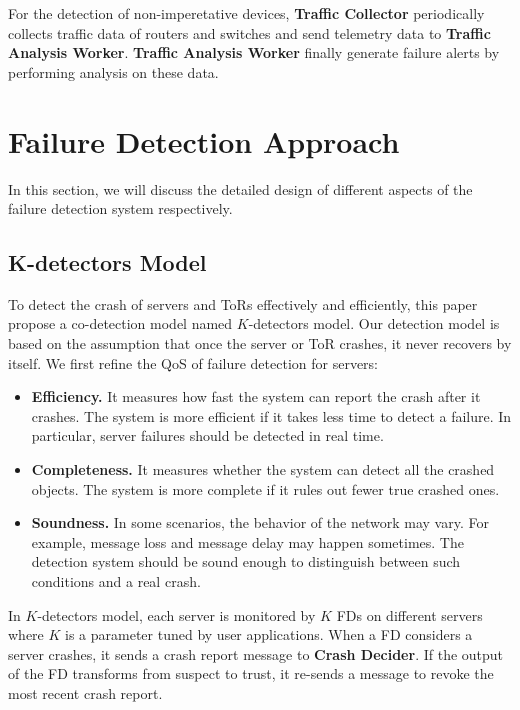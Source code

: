 \documentclass{sig-alternate-05-2015}
\begin{document}
For the detection of non-imperetative devices, \textbf{Traffic Collector} periodically collects traffic data of routers and switches and send telemetry data to \textbf{Traffic Analysis Worker}. \textbf{Traffic Analysis Worker} finally generate failure alerts by performing analysis on these data.



\section{Failure Detection Approach}
In this section, we will discuss the detailed design of different aspects of the failure detection system respectively.

\subsection{K-detectors Model}
To detect the crash of servers and ToRs effectively and efficiently, this paper propose a co-detection model named $K$-detectors model. Our detection model is based on the assumption that once the server or ToR crashes, it never recovers by itself. We first refine the QoS of failure detection for servers:

\begin{itemize}
\item \textbf{Efficiency.} It measures how fast the system can report the crash after it crashes. The system is more efficient if it takes less time to detect a failure. In particular, server failures should be detected in real time.
\item \textbf{Completeness.} It measures whether the system can detect all the crashed objects. The system is more complete if it rules out fewer true crashed ones.
\item \textbf{Soundness.} In some scenarios, the behavior of the network may vary. For example, message loss and message delay may happen sometimes. The detection system should be sound enough to distinguish between such conditions and a real crash.

\end{itemize}

In $K$-detectors model, each server is monitored by $K$ FDs on different servers where $K$ is a parameter tuned by user applications. When a FD considers a server crashes, it sends a crash report message to \textbf{Crash Decider}. If the output of the FD transforms from suspect to trust, it re-sends a message to revoke the most recent crash report.
\end{document}
